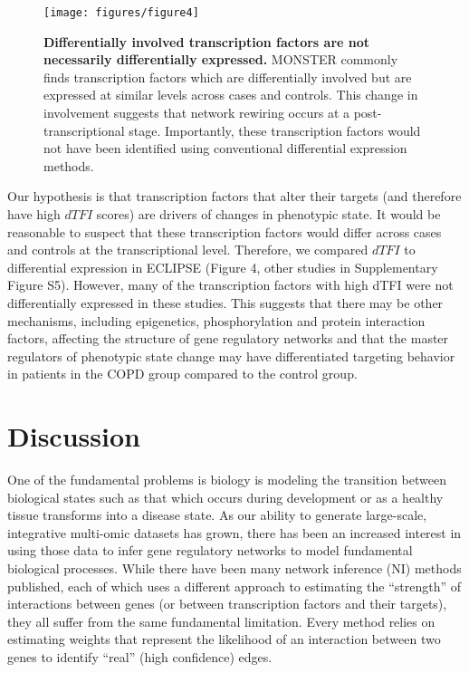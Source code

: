 \documentclass[9pt,twocolumn,twoside]{pnas-new}
\begin{document}
\begin{figure}
\texttt{[image: figures/figure4]}
\caption{\textbf{Differentially involved transcription factors are not necessarily
differentially expressed.} MONSTER commonly finds transcription factors
which are differentially involved but are expressed at similar levels
across cases and controls. This change in involvement suggests that
network rewiring occurs at a post-transcriptional stage. Importantly,
these transcription factors would not have been identified using conventional
differential expression methods.}
\label{fig:expression}
\end{figure}

Our hypothesis is that transcription factors that alter their targets
(and therefore have high $dTFI$ scores) are drivers of changes in
phenotypic state. It would be reasonable to suspect that these transcription
factors would differ across cases and controls at the transcriptional
level. Therefore, we compared $dTFI$ to differential expression in
ECLIPSE (Figure 4, other studies in Supplementary Figure S5). However,
many of the transcription factors with high dTFI were not differentially
expressed in these studies. This suggests that there may be other
mechanisms, including epigenetics, phosphorylation and protein interaction
factors, affecting the structure of gene regulatory networks and that
the master regulators of phenotypic state change may have differentiated
targeting behavior in patients in the COPD group compared to the control
group.

\section*{Discussion}

One of the fundamental problems is biology is modeling the transition
between biological states such as that which occurs during development
or as a healthy tissue transforms into a disease state. As our ability
to generate large-scale, integrative multi-omic datasets has grown,
there has been an increased interest in using those data to infer
gene regulatory networks to model fundamental biological processes.
While there have been many network inference (NI) methods published,
each of which uses a different approach to estimating the \textquotedblleft strength\textquotedblright{}
of interactions between genes (or between transcription factors and
their targets), they all suffer from the same fundamental limitation.
Every method relies on estimating weights that represent the likelihood
of an interaction between two genes to identify \textquotedblleft real\textquotedblright{}
(high confidence) edges.
\end{document}
